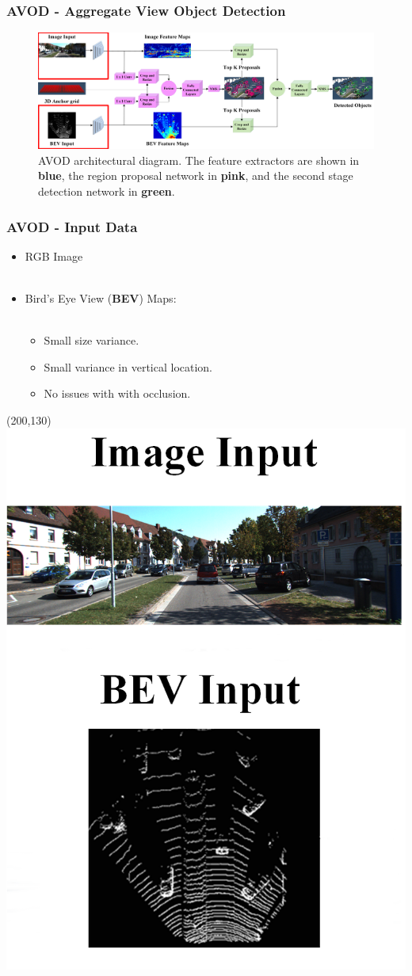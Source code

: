 \documentclass[10pt,fleqn,unknownkeysallowed]{beamer}
\begin{document}
\begin{frame}
	\frametitle{AVOD - Aggregate View Object Detection}
	\begin{figure}
		\begin{center}
			\includegraphics[width=115mm]{images/Meta-Architecture_1}
		\end{center}
		\caption{AVOD architectural diagram. The feature extractors are shown in \textbf{blue}, the region proposal network in \textbf{pink}, and the second stage detection network in \textbf{green}.}
	\end{figure}
\end{frame}


\begin{frame}
	\frametitle{AVOD - Input Data}
	\begin{itemize}
		\item{RGB Image}
		\\~\\
		\item{Bird's Eye View (\textbf{BEV}) Maps:}
		\\~\\
		\begin{itemize}
			\item{Small size variance.}
			\item{Small variance in vertical location.}
			\item{No issues with with occlusion.}
		\end{itemize}
	\end{itemize}
	\begin{picture}(200,130)
	\hspace{6.2cm}
		\includegraphics[width=0.5\linewidth]{images/Meta-Architecture_input}
	\end{picture}
\end{frame}
\end{document}
